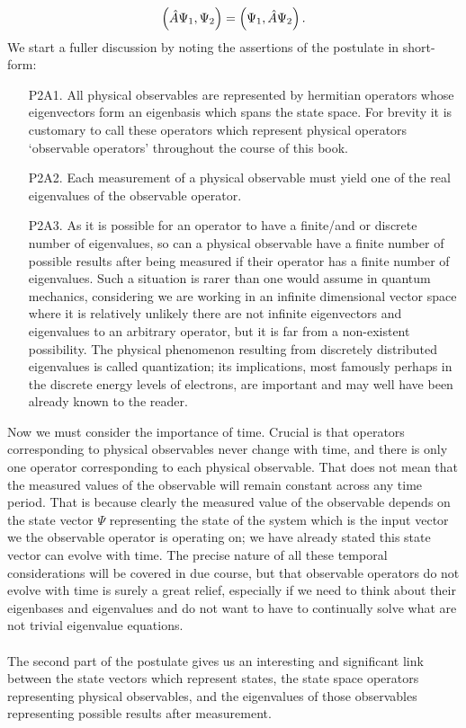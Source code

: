 $$
\left(\hat{A}\Psi_{1},\Psi_{2}\right)=\left(\Psi_{1},\hat{A}\Psi_{2}\right).
$$
We start a fuller discussion by noting the assertions of the postulate in short-form:
\begin{enumerate}
    \item[P2A1.] All physical observables are represented by hermitian operators whose eigenvectors form an eigenbasis which spans the state space. For brevity it is customary to call these operators which represent physical operators `observable operators' throughout the course of this book.
    \item[P2A2.] Each measurement of a physical observable must yield one of the real eigenvalues of the observable operator.
    \item[P2A3.] As it is possible for an operator to have a finite/and or discrete number of eigenvalues, so can a physical observable have a finite number of possible results after being measured if their operator has a finite number of eigenvalues. Such a situation is rarer than one would assume in quantum mechanics, considering we are working in an infinite dimensional vector space where it is relatively unlikely there are not infinite eigenvectors and eigenvalues to an arbitrary operator, but it is far from a non-existent possibility. The physical phenomenon resulting from discretely distributed eigenvalues is called quantization; its implications, most famously perhaps in the discrete energy levels of electrons, are important and may well have been already known to the reader.
\end{enumerate}
Now we must consider the importance of time. Crucial is that operators corresponding to physical observables never change with time, and there is only one operator corresponding to each physical observable.  That does not mean that the measured values of the observable will remain constant across any time period. That is because clearly the measured value of the observable depends on the state vector $\Psi$ representing the state of the system which is the input vector we the observable operator is operating on; we have already stated this state vector can evolve with time. The precise nature of all these temporal considerations will be covered in due course, but that observable operators do not evolve with time is surely a great relief, especially if we need to think about their eigenbases and eigenvalues and do not want to have to continually solve what are not trivial eigenvalue equations.
\\\\
The second part of the postulate gives us an interesting and significant link between the state vectors which represent states, the state space operators representing physical observables, and the eigenvalues of those observables representing possible results after measurement. 
